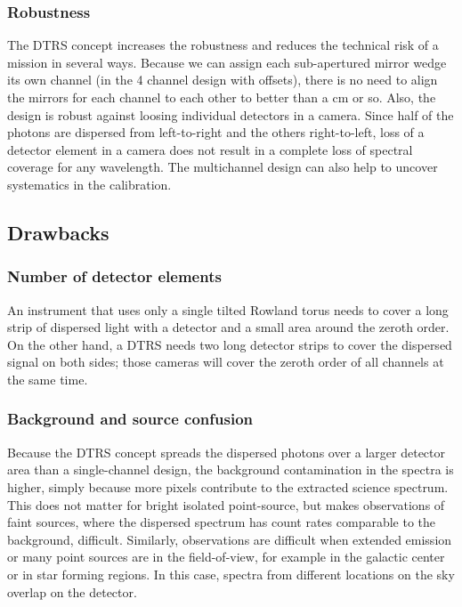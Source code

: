\documentclass[linenumbers]{aastex631}
\begin{document}
\subsubsection{Robustness}
The DTRS concept increases the robustness and reduces the technical risk of a mission in several ways. Because we can assign each sub-apertured mirror wedge its own channel (in the 4 channel design with offsets), there is no need to align the mirrors for each channel to each other to better than a cm or so.
Also, the design is robust against loosing individual detectors in a camera. Since half of the photons are dispersed from left-to-right and the others right-to-left, loss of a detector element in a camera does not result in a complete loss of spectral coverage for any wavelength. The multichannel design can also help to uncover systematics in the calibration.




\subsection{Drawbacks}
\subsubsection{Number of detector elements}
An instrument that uses only a single tilted Rowland torus needs to cover a long strip of dispersed light with a detector and a small area around the zeroth order. On the other hand, a DTRS needs two long detector strips to cover the dispersed signal on both sides; those cameras will cover the zeroth order of all channels at the same time.

\subsubsection{Background and source confusion}
Because the DTRS concept spreads the dispersed photons over a larger detector area than a single-channel design, the background contamination in the spectra is higher, simply because more pixels contribute to the extracted science spectrum. This does not matter for bright isolated point-source, but makes observations of faint sources, where the dispersed spectrum has count rates comparable to the background, difficult. Similarly, observations are difficult when extended emission or many point sources are in the field-of-view, for example in the galactic center or in star forming regions. In this case, spectra from different locations on the sky overlap on the detector.
\end{document}
